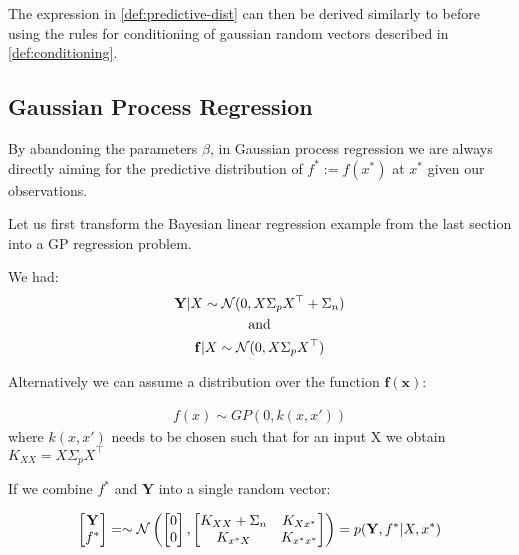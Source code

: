 The expression in \ref{def:predictive-dist} can then be derived similarly to before using the rules for
conditioning of gaussian random vectors described in \ref{def:conditioning}.

\subsection{Gaussian Process Regression}
By abandoning the parameters $\beta$, in Gaussian process regression we are always
directly aiming for the predictive distribution of
$f^{\ast} := f(x^{\ast})$ at $x^{\ast}$ given our observations.

Let us first transform the Bayesian linear regression example from the last section
into a GP regression problem.

We had:
\begin{gather*}
    \mathbf{Y}|X \sim \operatorname{\mathcal{N}}(0,  X \Sigma_p X^{\top} + \Sigma_n) \\
    \text{and} \\
    \mathbf{f}|X \sim \operatorname{\mathcal{N}}(0,  X \Sigma_p X^{\top})
\end{gather*}

Alternatively we can assume a distribution over the function $\mathbf{f(x)}$:

\begin{gather*}
    f(x) \sim GP(0, k(x, x'))
\end{gather*}
where $k(x,x')$ needs to be chosen such that for an input X we obtain $K_{XX} =  X \Sigma_p X^{\top}$

%


If we combine $f^{\ast}$ and $\mathbf{Y}$ into a single random vector:

\begin{gather}
    \begin{bmatrix}
        \mathbf{Y} \\
        f^{\ast}
    \end{bmatrix} =
    \sim \operatorname{\mathcal{N}} \left(
        \begin{bmatrix}
        0 \\
        0
        \end{bmatrix},
        \begin{bmatrix}
        K_{XX} + \Sigma_n & K_{Xx^{\ast}} \\
        K_{x^{\ast}X} & K_{x^{\ast}x^{\ast}}
        \end{bmatrix}
        \right)
    = p(\mathbf{Y}, f^{\ast}| X, x^{\ast})
\end{gather}

